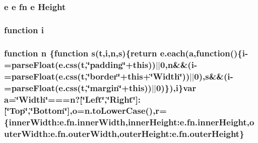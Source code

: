 \hypertarget{static_2root_2js_2bootstrap_2jquery-ui-1_810_84_8custom_8min_8js_a1a6d2f0a7302d6ffa1db9fa5313e2705}{
\subsubsection[{Height}]{ {\bf e} {\bf e} {\bf fn} {\bf e} Height}}\label{static_2root_2js_2bootstrap_2jquery-ui-1_810_84_8custom_8min_8js_a1a6d2f0a7302d6ffa1db9fa5313e2705}
\hypertarget{static_2root_2js_2bootstrap_2jquery-ui-1_810_84_8custom_8min_8js_aba29173262d28394924f99eb2ed5b31b}{
\subsubsection[{i}]{\setlength{\rightskip}{0pt plus 5cm}function i}}\label{static_2root_2js_2bootstrap_2jquery-ui-1_810_84_8custom_8min_8js_aba29173262d28394924f99eb2ed5b31b}
\hypertarget{static_2root_2js_2bootstrap_2jquery-ui-1_810_84_8custom_8min_8js_afc984c4f6c68ce30a0af99006f5f8d27}{
\subsubsection[{n}]{\setlength{\rightskip}{0pt plus 5cm}function n \{function {\bf s}({\bf t},{\bf i},n,{\bf s})\{return {\bf e.\-each}({\bf a},function()\{{\bf i}-\/=parse\-Float(e.\-css({\bf t},\char`\"{}padding\char`\"{}+this))$\vert$$\vert$0,n\&\&({\bf i}-\/=parse\-Float(e.\-css({\bf t},\char`\"{}border\char`\"{}+this+\char`\"{}Width\char`\"{}))$\vert$$\vert$0),s\&\&({\bf i}-\/=parse\-Float(e.\-css({\bf t},\char`\"{}margin\char`\"{}+this))$\vert$$\vert$0)\}),{\bf i}\}var {\bf a}=\char`\"{}Width\char`\"{}===n?\mbox{[}\char`\"{}Left\char`\"{},\char`\"{}{\bf Right}\char`\"{}\mbox{]}\-:\mbox{[}\char`\"{}Top\char`\"{},\char`\"{}{\bf Bottom}\char`\"{}\mbox{]},o=n.\-to\-Lower\-Case(),{\bf r}=\{inner\-Width\-:e.\-fn.\-inner\-Width,inner\-Height\-:e.\-fn.\-inner\-Height,outer\-Width\-:e.\-fn.\-outer\-Width,outer\-Height\-:e.\-fn.\-outer\-Height\}}}\label{static_2root_2js_2bootstrap_2jquery-ui-1_810_84_8custom_8min_8js_afc984c4f6c68ce30a0af99006f5f8d27}
